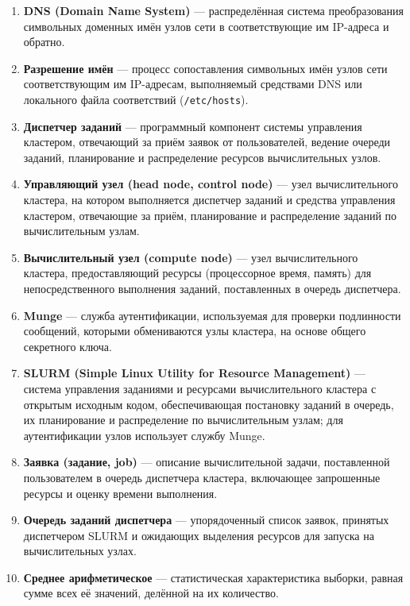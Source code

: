 \begin{enumerate}
\item \textbf{DNS (Domain Name System)} --- распределённая система
преобразования символьных доменных имён узлов сети в соответствующие им
IP-адреса и обратно.

\item \textbf{Разрешение имён} --- процесс сопоставления символьных имён
узлов сети соответствующим им IP-адресам, выполняемый средствами DNS или
локального файла соответствий (\texttt{/etc/hosts}).

\item \textbf{Диспетчер заданий} --- программный компонент системы
управления кластером, отвечающий за приём заявок от пользователей, ведение
очереди заданий, планирование и распределение ресурсов вычислительных
узлов.

\item \textbf{Управляющий узел (head node, control node)} --- узел
вычислительного кластера, на котором выполняется диспетчер заданий и
средства управления кластером, отвечающие за приём, планирование и
распределение заданий по вычислительным узлам.

\item \textbf{Вычислительный узел (compute node)} --- узел вычислительного
кластера, предоставляющий ресурсы (процессорное время, память) для
непосредственного выполнения заданий, поставленных в очередь диспетчера.

\item \textbf{Munge} --- служба аутентификации, используемая для
проверки подлинности сообщений, которыми обмениваются узлы кластера, на
основе общего секретного ключа.

\item \textbf{SLURM (Simple Linux Utility for Resource Management)} ---
система управления заданиями и ресурсами вычислительного кластера с
открытым исходным кодом, обеспечивающая постановку заданий в очередь, их
планирование и распределение по вычислительным узлам; для аутентификации
узлов использует службу Munge.

\item \textbf{Заявка (задание, job)} --- описание вычислительной задачи,
поставленной пользователем в очередь диспетчера кластера, включающее
запрошенные ресурсы и оценку времени выполнения.

\item \textbf{Очередь заданий диспетчера} --- упорядоченный список заявок,
принятых диспетчером SLURM и ожидающих выделения ресурсов для запуска на
вычислительных узлах.
\item \textbf{Среднее арифметическое} --- статистическая характеристика
выборки, равная сумме всех её значений, делённой на их количество.


\end{enumerate}
